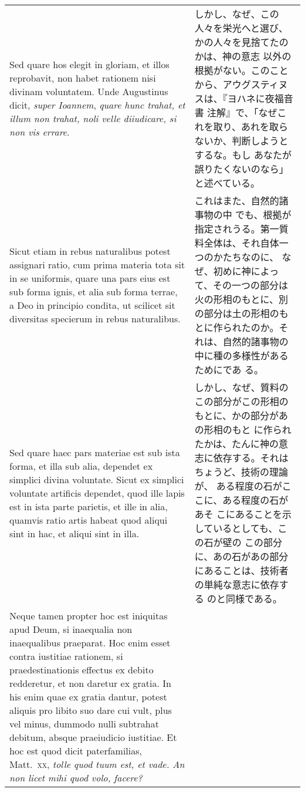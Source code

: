\documentclass[10pt]{jsarticle} %
\begin{document}
\begin{longtable}{p{21em}p{21em}}
\\



Sed
quare hos elegit in gloriam, et illos reprobavit, non habet rationem
nisi divinam voluntatem. Unde Augustinus dicit, {\itshape super Ioannem}, {\itshape quare
hunc trahat, et illum non trahat, noli velle diiudicare, si non vis
errare}. 


&

しかし、なぜ、この人々を栄光へと選び、かの人々を見捨てたのかは、神の意志
 以外の根拠がない。このことから、アウグスティヌスは、『ヨハネに夜福音書
 注解』で、「なぜこれを取り、あれを取らないか、判断しようとするな。もし
 あなたが誤りたくないのなら」と述べている。

\\


Sicut etiam in rebus naturalibus potest assignari ratio, cum
prima materia tota sit in se uniformis, quare una pars eius est sub
forma ignis, et alia sub forma terrae, a Deo in principio condita, ut
scilicet sit diversitas specierum in rebus naturalibus. 

&



これはまた、自然的諸事物の中
 でも、根拠が指定されうる。第一質料全体は、それ自体一つのかたちなのに、
 なぜ、初めに神によって、その一つの部分は火の形相のもとに、別の部分は土の形相のも
 とに作られたのか。それは、自然的諸事物の中に種の多様性があるためにであ
 る。


\\



Sed quare haec
pars materiae est sub ista forma, et illa sub alia, dependet ex simplici
divina voluntate. Sicut ex simplici voluntate artificis dependet, quod
ille lapis est in ista parte parietis, et ille in alia, quamvis ratio
artis habeat quod aliqui sint in hac, et aliqui sint in illa. 


&

しかし、なぜ、質料のこの部分がこの形相のもとに、かの部分があの形相のもと
 に作られたかは、たんに神の意志に依存する。それはちょうど、技術の理論が、
ある程度の石がここに、ある程度の石があそ
 こにあることを示しているとしても、この石が壁の
 この部分に、あの石があの部分にあることは、技術者の単純な意志に依存する
 のと同様である。


\\


Neque
tamen propter hoc est iniquitas apud Deum, si inaequalia non
inaequalibus praeparat. Hoc enim esset contra iustitiae rationem, si
praedestinationis effectus ex debito redderetur, et non daretur ex
gratia. In his enim quae ex gratia dantur, potest aliquis pro libito suo
dare cui vult, plus vel minus, dummodo nulli subtrahat debitum, absque
praeiudicio iustitiae. Et hoc est quod dicit paterfamilias, Matt.~{\scshape xx},
{\itshape tolle quod tuum est, et vade. An non licet mihi quod volo, facere?}


\end{longtable}
\end{document}
